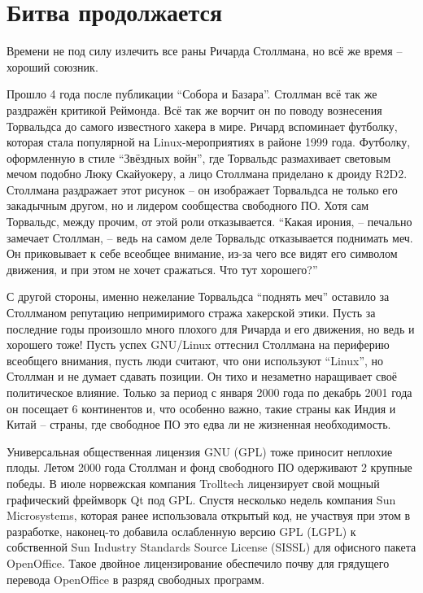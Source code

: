 

\chapter{Битва продолжается}

Времени не под силу излечить все раны Ричарда Столлмана, но всё же время -- хороший союзник.

Прошло 4 года после публикации \enquote{Собора и Базара}. Столлман всё так же раздражён критикой Реймонда. Всё так же ворчит он по поводу вознесения Торвальдса до самого известного хакера в мире. Ричард вспоминает футболку, которая стала популярной на Linux-мероприятиях в районе 1999 года. Футболку, оформленную в стиле \enquote{Звёздных войн}, где Торвальдс размахивает световым мечом подобно Люку Скайуокеру, а лицо Столлмана приделано к дроиду R2D2. Столлмана раздражает этот рисунок -- он изображает Торвальдса не только его закадычным другом, но и лидером сообщества свободного ПО. Хотя сам Торвальдс, между прочим, от этой роли отказывается. \enquote{Какая ирония, -- печально замечает Столлман, -- ведь на самом деле Торвальдс отказывается поднимать меч. Он приковывает к себе всеобщее внимание, из-за чего все видят его символом движения, и при этом не хочет сражаться. Что тут хорошего?}

С другой стороны, именно нежелание Торвальдса \enquote{поднять меч} оставило за Столлманом репутацию непримиримого стража хакерской этики. Пусть за последние годы произошло много плохого для Ричарда и его движения, но ведь и хорошего тоже! Пусть успех GNU/Linux оттеснил Столлмана на периферию всеобщего внимания, пусть люди считают, что они используют \enquote{Linux}, но Столлман и не думает сдавать позиции. Он тихо и незаметно наращивает своё политическое влияние. Только за период с января 2000 года по декабрь 2001 года он посещает 6 континентов и, что особенно важно, такие страны как Индия и Китай -- страны, где свободное ПО это едва ли не жизненная необходимость.

Универсальная общественная лицензия GNU (GPL) тоже приносит неплохие плоды. Летом 2000 года Столлман и фонд свободного ПО одерживают 2 крупные победы. В июле норвежская компания Trolltech лицензирует свой мощный графический фреймворк Qt под GPL. Спустя несколько недель компания Sun Microsystems, которая ранее использовала открытый код, не участвуя при этом в разработке, наконец-то добавила ослабленную версию GPL (LGPL) к собственной Sun Industry Standards Source License (SISSL) для офисного пакета OpenOffice. Такое двойное лицензирование обеспечило почву для грядущего перевода OpenOffice  в разряд свободных программ.

